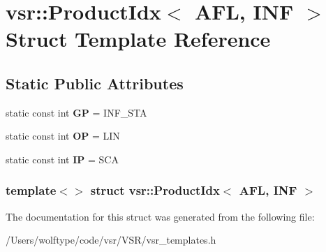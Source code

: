 \hypertarget{structvsr_1_1_product_idx_3_01_a_f_l_00_01_i_n_f_01_4}{\section{vsr\-:\-:Product\-Idx$<$ A\-F\-L, I\-N\-F $>$ Struct Template Reference}
\label{structvsr_1_1_product_idx_3_01_a_f_l_00_01_i_n_f_01_4}
}
\subsection*{Static Public Attributes}
\begin{DoxyCompactItemize}
\item 
\hypertarget{structvsr_1_1_product_idx_3_01_a_f_l_00_01_i_n_f_01_4_a62b4948327d5f124ef913d45e8cdaaf8}{static const int {\bfseries G\-P} = I\-N\-F\-\_\-\-S\-T\-A}\label{structvsr_1_1_product_idx_3_01_a_f_l_00_01_i_n_f_01_4_a62b4948327d5f124ef913d45e8cdaaf8}

\item 
\hypertarget{structvsr_1_1_product_idx_3_01_a_f_l_00_01_i_n_f_01_4_a813295bbe4675f2e523f0e4582f9fde9}{static const int {\bfseries O\-P} = L\-I\-N}\label{structvsr_1_1_product_idx_3_01_a_f_l_00_01_i_n_f_01_4_a813295bbe4675f2e523f0e4582f9fde9}

\item 
\hypertarget{structvsr_1_1_product_idx_3_01_a_f_l_00_01_i_n_f_01_4_a5cef560b80c1dedee37939ccd8744255}{static const int {\bfseries I\-P} = S\-C\-A}\label{structvsr_1_1_product_idx_3_01_a_f_l_00_01_i_n_f_01_4_a5cef560b80c1dedee37939ccd8744255}

\end{DoxyCompactItemize}
\subsubsection*{template$<$$>$ struct vsr\-::\-Product\-Idx$<$ A\-F\-L, I\-N\-F $>$}



The documentation for this struct was generated from the following file\-:\begin{DoxyCompactItemize}
\item 
/\-Users/wolftype/code/vsr/\-V\-S\-R/vsr\-\_\-templates.\-h\end{DoxyCompactItemize}
